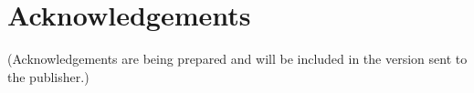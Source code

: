
\section*{Acknowledgements}

(Acknowledgements are being prepared and will be included in the version sent to the publisher.)